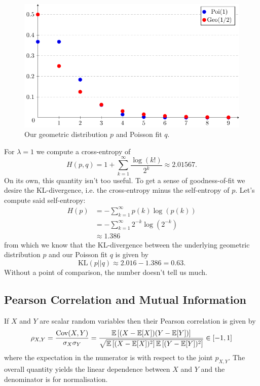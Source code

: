 \documentclass[11pt]{article}
\begin{document}
\begin{appendices}
\begin{figure}[t]
    \centering
    \includegraphics[width=\columnwidth]{./figures/appendix/poi_geo_plot.pdf}
    \caption{Our geometric distribution $p$ and Poisson fit $q$.}
    \label{fig:poi_geo_plot}
\end{figure}

For $\lambda=1$ we compute a cross-entropy of
$$
H(p,q)
=
1+\sum_{k=1}^{\infty}\frac{\log(k!)}{2^k}
\approx
2.01567.
$$
On its own, this quantity isn't too useful. To get a sense of goodness-of-fit we desire the KL-divergence, i.e. the cross-entropy minus the self-entropy of $p$. Let's compute said self-entropy:
\begin{align*}
    H(p)
    &=
    -\sum_{k=1}^{\infty}p(k)\log(p(k))\\
    &=
    -\sum_{k=1}^{\infty}2^{-k}\log(2^{-k})\\
    &\approx
    1.386
\end{align*}
from which we know that the KL-divergence between the underlying geometric distribution $p$ and our Poisson fit $q$ is given by
$$
\text{KL}(p||q)
\approx
2.016-1.386
=
0.63.
$$
Without a point of comparison, the number doesn't tell us much.

\subsection{Pearson Correlation and Mutual Information}
\label{app:pearson_correlation}
If $X$ and $Y$ are scalar random variables then their Pearson correlation is given by
$$
\rho_{X,Y}
=
\frac{\text{Cov}(X,Y)}{\sigma_X\sigma_Y}
=
\frac{\mathbb{E}\left[(X-\mathbb{E}[X])(Y-\mathbb{E}[Y])\right]}{\sqrt{\mathbb{E}\left[(X-\mathbb{E}[X])^2\right]\mathbb{E}\left[(Y-\mathbb{E}[Y])^2\right]}}
\in[-1,1]
$$
where the expectation in the numerator is with respect to the joint $p_{X,Y}$. The overall quantity yields the linear dependence between $X$ and $Y$ and the denominator is for normalisation.


\end{appendices}
\end{document}

